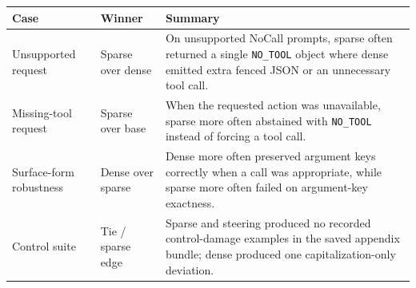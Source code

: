 
\begin{tabularx}{\textwidth}{l l X}
\toprule
Case & Winner & Summary \\
\midrule
Unsupported request & Sparse over dense & On unsupported NoCall prompts, sparse often returned a single \texttt{NO\_TOOL} object where dense emitted extra fenced JSON or an unnecessary tool call. \\
Missing-tool request & Sparse over base & When the requested action was unavailable, sparse more often abstained with \texttt{NO\_TOOL} instead of forcing a tool call. \\
Surface-form robustness & Dense over sparse & Dense more often preserved argument keys correctly when a call was appropriate, while sparse more often failed on argument-key exactness. \\
Control suite & Tie / sparse edge & Sparse and steering produced no recorded control-damage examples in the saved appendix bundle; dense produced one capitalization-only deviation. \\
\bottomrule
\end{tabularx}
